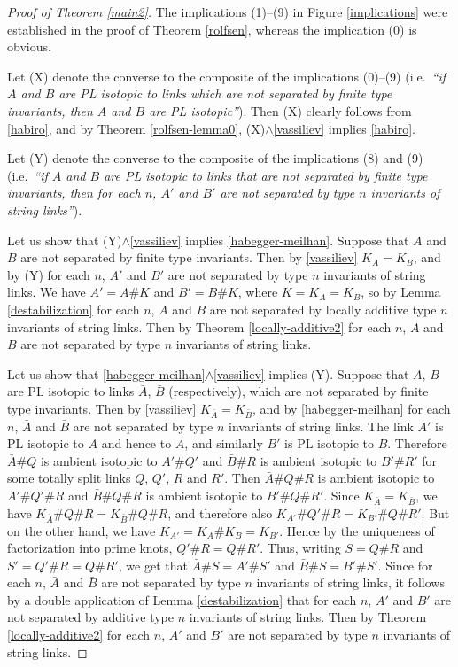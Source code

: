 \documentclass[a4paper,12pt,reqno,oneside]{amsart} %
\theoremstyle{plain}
\theoremstyle{definition}
\theoremstyle{named}
\renewcommand{\:}{\colon}
\begin{document}
\begin{proof}[Proof of Theorem \ref{main2}] 
The implications (1)--(9) in Figure \ref{implications} were established in the proof of Theorem \ref{rolfsen}, whereas 
the implication (0) is obvious.

Let (X) denote the converse to the composite of the implications (0)--(9) (i.e.\ {\it ``if $A$ and $B$ are PL isotopic to links
which are not separated by finite type invariants, then $A$ and $B$ are PL isotopic''}).
Then (X) clearly follows from \ref{habiro}, and by Theorem \ref{rolfsen-lemma0}, (X)$\land$\ref{vassiliev} implies \ref{habiro}.

Let (Y) denote the converse to the composite of the implications (8) and (9) (i.e.\ {\it ``if $A$ and $B$ are PL isotopic to links that are not 
separated by finite type invariants, then for each $n$, $A'$ and $B'$ are not separated by type $n$ invariants of string links''}).

Let us show that (Y)$\land$\ref{vassiliev} implies \ref{habegger-meilhan}.
Suppose that $A$ and $B$ are not separated by finite type invariants.
Then by \ref{vassiliev} $K_A=K_B$, and by (Y) for each $n$, $A'$ and $B'$ are not separated by type $n$ invariants of string links.
We have $A'=A\#K$ and $B'=B\#K$, where $K=K_A=K_B$, so by Lemma \ref{destabilization} for each $n$, $A$ and $B$ are not separated by 
locally additive type $n$ invariants of string links.
Then by Theorem \ref{locally-additive2} for each $n$, $A$ and $B$ are not separated by type $n$ invariants of string links.

Let us show that \ref{habegger-meilhan}$\land$\ref{vassiliev} implies (Y).
Suppose that $A$, $B$ are PL isotopic to links $\bar A$, $\bar B$ (respectively), which are not separated by finite type invariants.
Then by \ref{vassiliev} $K_{\bar A}=K_{\bar B}$, and by \ref{habegger-meilhan} for each $n$, 
$\bar A$ and $\bar B$ are not separated by type $n$ invariants of string links.
The link $A'$ is PL isotopic to $A$ and hence to $\bar A$, and similarly $B'$ is PL isotopic to $\bar B$.
Therefore $\bar A\#Q$ is ambient isotopic to $A'\#Q'$ and $\bar B\#R$ is ambient isotopic to $B'\#R'$
for some totally split links $Q$, $Q'$, $R$ and $R'$.
Then $\bar A\#Q\#R$ is ambient isotopic to $A'\#Q'\#R$ and $\bar B\#Q\#R$ is ambient isotopic to $B'\#Q\#R'$.
Since $K_{\bar A}=K_{\bar B}$, we have $K_{\bar A}\#Q\#R=K_{\bar B}\#Q\#R$, and therefore also
$K_{A'}\#Q'\#R=K_{B'}\#Q\#R'$.
But on the other hand, we have $K_{A'}=K_A\#K_B=K_{B'}$.
Hence by the uniqueness of factorization into prime knots, $Q'\#R=Q\#R'$.
Thus, writing $S=Q\#R$ and $S'=Q'\#R=Q\#R'$, we get that $\bar A\# S=A'\#S'$ and $\bar B\#S=B'\#S'$.
Since for each $n$, $\bar A$ and $\bar B$ are not separated by type $n$ invariants of string links, 
it follows by a double application of Lemma \ref{destabilization} that for each $n$, 
$A'$ and $B'$ are not separated by additive type $n$ invariants of string links.
Then by Theorem \ref{locally-additive2} for each $n$, $A'$ and $B'$ are not separated by type $n$ invariants of string links.


\end{proof}
\end{document}
